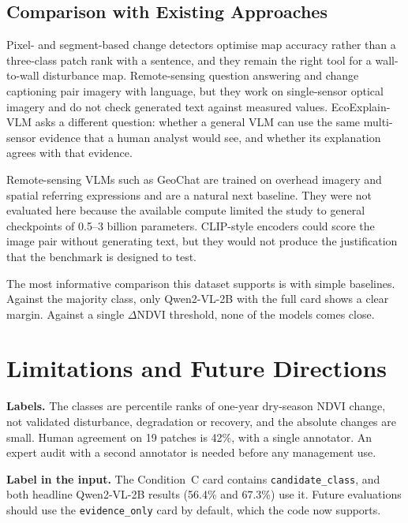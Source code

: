 \documentclass[11pt]{article}
\begin{document}
\subsection{Comparison with Existing Approaches}

Pixel- and segment-based change detectors
\citep{hansen2013,kennedy2010,zhu2014,daudt2018} optimise map accuracy
rather than a three-class patch rank with a sentence, and they remain
the right tool for a wall-to-wall disturbance map. Remote-sensing
question answering \citep{lobry2020} and change captioning
\citep{liu2022levircc} pair imagery with language, but they work on
single-sensor optical imagery and do not check generated text against
measured values. EcoExplain-VLM asks a different question: whether a
general VLM can use the same multi-sensor evidence that a human analyst
would see, and whether its explanation agrees with that evidence.

Remote-sensing VLMs such as GeoChat \citep{kuckreja2024} are trained on
overhead imagery and spatial referring expressions and are a natural
next baseline. They were not evaluated here because the available
compute limited the study to general checkpoints of 0.5--3 billion
parameters. CLIP-style encoders \citep{radford2021} could score the
image pair without generating text, but they would not produce the
justification that the benchmark is designed to test.

The most informative comparison this dataset supports is with simple
baselines. Against the majority class, only Qwen2-VL-2B with the full
card shows a clear margin. Against a single $\Delta$NDVI threshold, none
of the models comes close.


\section{Limitations and Future Directions}

\textbf{Labels.} The classes are percentile ranks of one-year
dry-season NDVI change, not validated disturbance, degradation or
recovery, and the absolute changes are small. Human agreement on 19
patches is 42\%, with a single annotator. An expert audit with a second
annotator is needed before any management use.

\textbf{Label in the input.} The Condition~C card contains
\texttt{candidate\_class}, and both headline Qwen2-VL-2B results (56.4\%
and 67.3\%) use it. Future evaluations should use the
\texttt{evidence\_only} card by default, which the code now supports.
\end{document}
